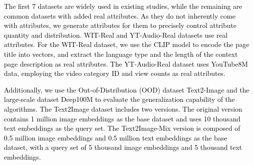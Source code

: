 \documentclass[sigconf, nonacm, pdfa]{acmart}
\begin{document}
{	\textcolor{black}{The first 7 datasets are widely used in existing studies, while the remaining are common datasets with added real attributes. As they do not inherently come with attributes, we generate attributes for them to precisely control attribute quantity and distribution. WIT-Real and YT-Audio-Real datasets use real attributes. For the WIT-Real dataset, we use the CLIP model to encode the page title into vectors, and extract the language type and the length of the context page description  as real attributes. The YT-Audio-Real dataset uses YouTube8M data, employing the video category ID and view counts as real attributes.}
	
	\textcolor{black}{Additionally, we use the Out-of-Distribution (OOD) dataset Text2-Image and the large-scale dataset Deep100M to evaluate the generalization capability of the algorithms. The Text2Image dataset includes two versions. The original version contains 1 million image embeddings as the base dataset and uses 10 thousand text embeddings as the query set. The Text2Image-Mix version is composed of 0.5 million image embeddings and 0.5 million text embeddings as the base dataset, with a query set of 5 thousand image embeddings and 5 thousand text embeddings.}
	

	

	
	
	\renewcommand{\arraystretch}{0.9}
	\begin{table}[t]
		\centering
		\setlength{\abovecaptionskip}{0.15cm}
		\setlength{\belowcaptionskip}{-0.1cm}
		
		
		\caption{Datasets}
		
		\label{tab:datasets_combined}
\end{table}}
\end{document}
